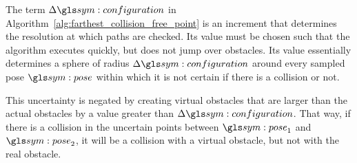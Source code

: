 	The term $\Delta\configuration$ in
	Algorithm~\ref{alg:farthest_collision_free_point} is an increment that
	determines the resolution at which paths are checked. Its value must be
	chosen such that the algorithm executes quickly, but does not jump over
	obstacles. Its value essentially determines a sphere of radius
	$\Delta\configuration$ around every sampled pose $\pose$ within which it
	is not certain if there is a collision or not.

	This uncertainty is negated by creating virtual obstacles that are
	larger than the actual obstacles by a value
	greater than $\Delta\configuration$. That way, if there is a collision
	in the uncertain points between $\pose_1$ and $\pose_2$, it will be a
	collision with a virtual obstacle, but not with the real obstacle.
